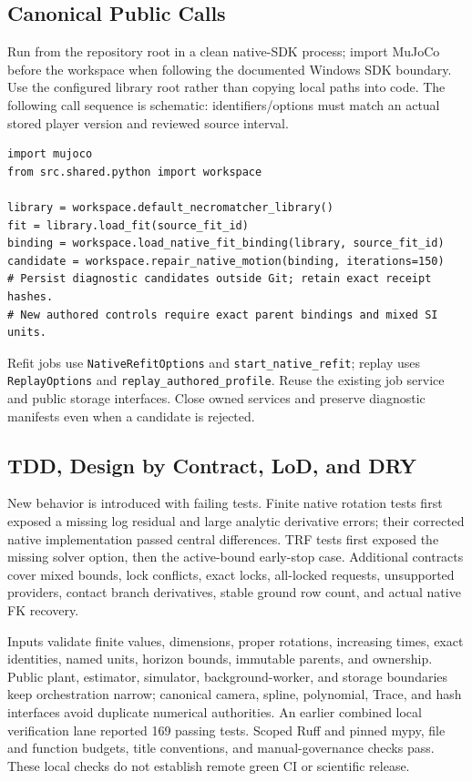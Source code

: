 \documentclass[11pt,letterpaper]{article}
\newcommand{\code}[1]{\nolinkurl{#1}}
\begin{document}
\subsection{Canonical Public Calls}
Run from the repository root in a clean native-SDK process; import MuJoCo
before the workspace when following the documented Windows SDK boundary.
Use the configured library root rather than copying local paths into code.
The following call sequence is schematic: identifiers/options must match
an actual stored player version and reviewed source interval.
\begin{verbatim}
import mujoco
from src.shared.python import workspace

library = workspace.default_necromatcher_library()
fit = library.load_fit(source_fit_id)
binding = workspace.load_native_fit_binding(library, source_fit_id)
candidate = workspace.repair_native_motion(binding, iterations=150)
# Persist diagnostic candidates outside Git; retain exact receipt hashes.
# New authored controls require exact parent bindings and mixed SI units.
\end{verbatim}
Refit jobs use \code{NativeRefitOptions} and \code{start_native_refit}; replay
uses \code{ReplayOptions} and \code{replay_authored_profile}. Reuse the existing
job service and public storage interfaces. Close owned services and preserve
diagnostic manifests even when a candidate is rejected.

\subsection{TDD, Design by Contract, LoD, and DRY}
New behavior is introduced with failing tests. Finite native rotation tests
first exposed a missing log residual and large analytic derivative errors;
their corrected native implementation passed central differences. TRF tests
first exposed the missing solver option, then the active-bound early-stop
case. Additional contracts cover mixed bounds, lock conflicts, exact locks,
all-locked requests, unsupported providers, contact branch derivatives,
stable ground row count, and actual native FK recovery.

Inputs validate finite values, dimensions, proper rotations, increasing times,
exact identities, named units, horizon bounds, immutable parents, and ownership.
Public plant, estimator, simulator, background-worker, and storage boundaries
keep orchestration narrow; canonical camera, spline, polynomial, Trace, and
hash interfaces avoid duplicate numerical authorities. An earlier combined local
verification lane reported 169 passing tests. Scoped Ruff and pinned mypy, file and
function budgets, title conventions, and manual-governance checks pass.
These local checks do not establish remote green CI or scientific release.
\end{document}
